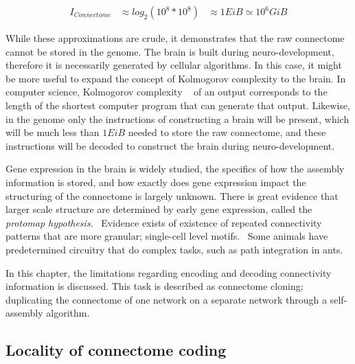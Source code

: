\documentclass[../dissertation.tex]{subfiles}
\begin{document}
\begin{align}
    \label{eqn:estimateConnData}
    I_{Connectome}  & \approx log_{2} \left( 10^{8} * 10^{8} \right)
                    & \approx 1 EiB \simeq 10^{6} GiB
\end{align}

While these approximations are crude, it demonstrates that the raw connectome cannot be stored in the genome.
The brain is built during neuro-development, therefore it is necessarily generated by cellular algorithms.
In this case, it might be more useful to expand the concept of Kolmogorov complexity to the brain.
In computer science, Kolmogorov complexity ~\cite{kolmogorovTablesRandomNumbers1998a} of an output corresponds to the length of the shortest computer program that can generate that output.
Likewise, in the genome only the instructions of constructing a brain will be present, which will be much less than $1 EiB$ needed to store the raw connectome, and these instructions will be decoded to construct the brain during neuro-development.

Gene expression in the brain is widely studied, the specifics of how the assembly information is stored, and how exactly does gene expression impact the structuring of the connectome is largely unknown.
There is great evidence that larger scale structure are determined by early gene expression, called the \textit{protomap hypothesis}.~\cite{Clowry.etal2018}
Evidence exists of existence of repeated connectivity patterns that are more granular; single-cell level motifs.~\cite{Shepherd2011}
Some animals have predetermined circuitry that do complex tasks, such as path integration in ants.
~\cite{ant-ring-attractor}

In this chapter, the limitations regarding encoding and decoding connectivity information is discussed.
This task is described as connectome cloning; duplicating the connectome of one network on a separate network through a self-assembly algorithm.

\subsection{Locality of connectome coding}
\end{document}
